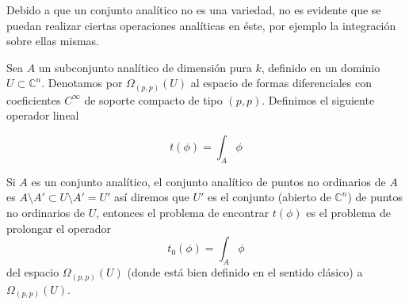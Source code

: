 \documentclass[letterpaper]{article}
\newcommand{\con}{\ensuremath{\mathbb{C}^n}}
\begin{document}
Debido a que un conjunto analítico no es una variedad, no es evidente que se puedan realizar ciertas operaciones analíticas en éste, por ejemplo la integración sobre ellas mismas.

Sea \(A\) un subconjunto analítico de dimensión pura \(k\), definido en un dominio \(U\subset\con\). Denotamos por \(\Omega_{(p,p)}(U)\) al espacio de formas diferenciales con coeficientes \(C^{\infty}\) de soporte compacto de tipo \((p,p)\). Definimos el siguiente operador lineal

\[
    t(\phi)=\int_{A}\phi
\]

Si \(A\) es un conjunto analítico, el conjunto analítico de puntos no ordinarios de \(A\) es \(A\setminus A'\subset U\setminus A'=U'\) así diremos que \(U'\) es el conjunto (abierto de \(\con\)) de puntos no ordinarios de \(U\), entonces el problema de encontrar \(t(\phi)\) es el problema de prolongar el operador
\[
    t_0(\phi)=\int_{A}\phi
\]
del espacio \(\Omega_{(p,p)}(U)\) (donde está bien definido en el sentido clásico) a \(\Omega_{(p,p)}(U)\).
\end{document}
